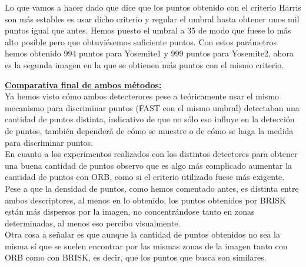\documentclass[10pt,a4paper]{article}
\begin{document}
\begin{figure}[H]
\centering
{}
\end{figure}

Lo que vamos a hacer dado que dice que los puntos obtenido con el criterio Harris son más estables es usar dicho criterio y regular el umbral hasta obtener unos mil puntos igual que antes. Hemos puesto el umbral a 35 de modo que fuese lo más alto posible pero que obtuviésemos suficiente puntos. Con estos parámetros hemos obtenido 994 puntos para Yosemite1 y 999 puntos para Yosemite2, ahora es la segunda imagen en la que se obtienen más puntos con el mismo criterio.\\

\begin{figure}[H]
\centering
{}
\end{figure}

\underline{\textbf{Comparativa final de ambos métodos:}}\\

Ya hemos visto cómo ambos detecterores pese a teóricamente usar el mismo mecanismo para discriminar puntos (FAST con el mismo umbral) detectaban una cantidad de puntos distinta, indicativo de que no sólo eso influye en la detección de puntos, también dependerá de cómo se muestre o de cómo se haga la medida para discriminar puntos.\\

En cuanto a los experimentos realizados con los distintos detectores para obtener una buena cantidad de puntos observo que es algo más complicado aumentar la cantidad de puntos con ORB, como si el criterio utilizado fuese más exigente.\\

Pese a que la densidad de puntos, como hemos comentado antes, es distinta entre ambos descriptores, al menos en lo obtenido, los puntos obtenidos por BRISK están más dispersos por la imagen, no concentrándose tanto en zonas determinadas, al menos eso percibo visualmente.\\

Otra cosa a señalar es que aunque la cantidad de puntos obtenidos no sea la misma sí que se suelen encontrar por las mismas zonas de la imagen tanto con ORB como con BRISK, es decir, que los puntos que busca son similares.\\
\end{document}
